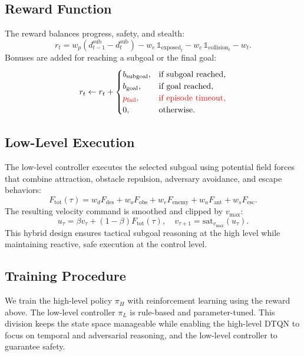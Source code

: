 \documentclass[letterpaper, 10 pt, conference]{ieeeconf}
\begin{document}
\subsection{Reward Function}
The reward balances progress, safety, and stealth:
\begin{equation}
r_t = w_p (d_{t-1}^{\text{sub}} - d_{t}^{\text{sub}})
      - w_e \,\mathbb{1}_{\text{exposed}_t}
      - w_c \,\mathbb{1}_{\text{collision}_t}
      - w_t.
\end{equation}
Bonuses are added for reaching a subgoal or the final goal:
\begin{equation}
r_t \leftarrow r_t +
\begin{cases}
b_{\text{subgoal}}, & \text{if subgoal reached},\\
b_{\text{goal}}, & \text{if goal reached},\\
\textcolor{red}{p_{\text{fail}},} & \textcolor{red}{\text{if episode timeout},}\\
0, & \text{otherwise}.
\end{cases}
\end{equation}

\subsection{Low-Level Execution}
The low-level controller executes the selected subgoal using potential field forces that combine attraction, obstacle repulsion, adversary avoidance, and escape behaviors:
\begin{equation}
F_{\text{tot}}(\tau) = w_d F_{\text{des}} + w_o F_{\text{obs}} + w_e F_{\text{enemy}}
+ w_a F_{\text{ant}} + w_s F_{\text{esc}}.
\end{equation}
The resulting velocity command is smoothed and clipped by $v_{\max}$:
\begin{equation}
u_\tau = \beta v_\tau + (1-\beta)F_{\text{tot}}(\tau), \quad
v_{\tau+1} = \mathrm{sat}_{v_{\max}}(u_\tau).
\end{equation}
This hybrid design ensures tactical subgoal reasoning at the high level while maintaining reactive, safe execution at the control level.

\subsection{Training Procedure}
We train the high-level policy $\pi_H$ with reinforcement learning using the reward above. The low-level controller $\pi_L$ is rule-based and parameter-tuned. This division keeps the state space manageable while enabling the high-level DTQN to focus on temporal and adversarial reasoning, and the low-level controller to guarantee safety.
\end{document}
